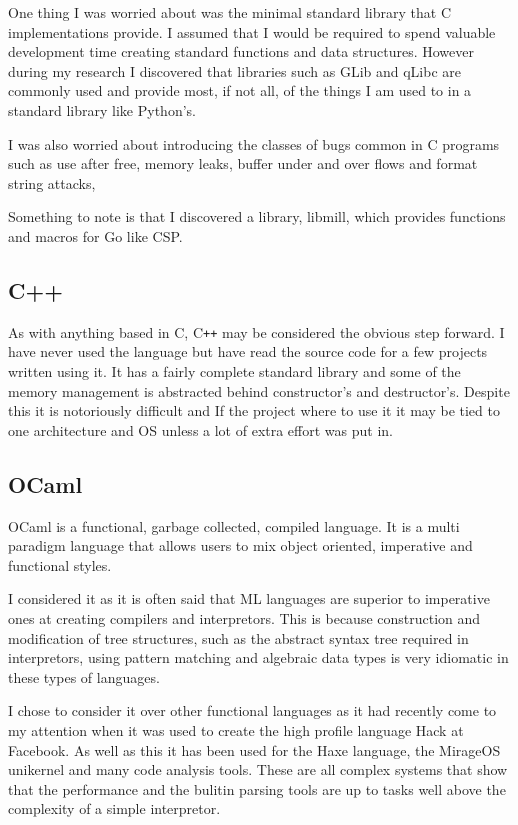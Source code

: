 One thing I was worried about was the minimal standard library that C implementations provide.
I assumed that I would be required to spend valuable development time creating standard functions and data structures.
However during my research I discovered that libraries such as GLib and qLibc are commonly used and provide most, if not all, of the things I am used to in a standard library like Python's.

I was also worried about introducing the classes of bugs common in C programs such as use after free, memory leaks, buffer under and over flows and format string attacks,

Something to note is that I discovered a library, libmill\cite{LIBMILL}, which provides functions and macros for Go like CSP.

\subsection{C++}

As with anything based in C, C\verb!++! may be considered the obvious step forward.
I have never used the language but have read the source code for a few projects written using it.
It has a fairly complete standard library and some of the memory management is abstracted behind constructor's and destructor's.
Despite this it is notoriously difficult and If the project where to use it it may be tied to one architecture and OS unless a lot of extra effort was put in.

\subsection{OCaml}
OCaml is a functional, garbage collected, compiled language.
It is a multi paradigm language that allows users to mix object oriented, imperative and functional styles.

I considered it as it is often said that ML languages are superior to imperative ones at creating compilers and interpretors. 
This is because construction and modification of tree structures, such as the abstract syntax tree required in interpretors, using pattern matching and algebraic data types is very idiomatic in these types of languages.

I chose to consider it over other functional languages as it had recently come to my attention when it was used to create the high profile language Hack at Facebook.
As well as this it has been used for the Haxe language, the MirageOS unikernel and many code analysis tools.
These are all complex systems that show that the performance and the bulitin parsing tools are up to tasks well above the complexity of a simple interpretor.

